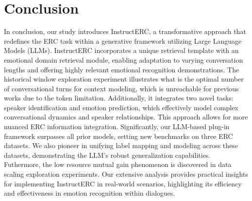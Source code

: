 \documentclass[conference]{IEEEtran}
\begin{document}
\section{Conclusion}
In conclusion, our study introduces InstructERC, a transformative approach that redefines the ERC task within a generative framework utilizing Large Language Models (LLMs). InstructERC incorporates a unique retrieval template with an emotional domain retrieval module, enabling adaptation to varying conversation lengths and offering highly relevant emotional recognition demonstrations. The historical window exploration experiment illustrates what is the optimal number of conversational turns for context modeling, which is unreachable for previous works due to the token limitation. Additionally, it integrates two novel tasks: speaker identification and emotion prediction, which effectively model complex conversational dynamics and speaker relationships. This approach allows for more nuanced ERC information integration. Significantly, our LLM-based plug-in framework surpasses all prior models, setting new benchmarks on three ERC datasets. We also pioneer in unifying label mapping and modeling across these datasets, demonstrating the LLM's robust generalization capabilities. Futhermore, the low resource mutual gain phenomenon is discovered in data scaling exploration experiments. Our extensive analysis provides practical insights for implementing InstructERC in real-world scenarios, highlighting its efficiency and effectiveness in emotion recognition within dialogues.
\end{document}
